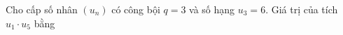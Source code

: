 \begin{ex}
Cho cấp số nhân $(u_n)$ có công bội $q=3$ và số hạng $u_3=6$. Giá trị của tích $u_1\cdot u_5$ bằng
\end{ex}
